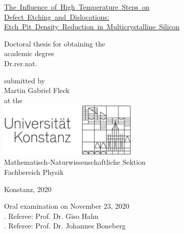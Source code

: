\documentclass[titlepage,a4paper]{article}
\newcommand{\tinyspace}{\nobreak\hspace{.16667em}}
\begin{document}
\thispagestyle{empty}
\begin{center}
  \begin{sffamily}
    \begin{bfseries}
      \begin{LARGE}
	\vspace*{8mm}
	\mbox{\ul{The Influence of High Temperature Steps on}}\\%
	\mbox{\ul{Defect Etching and Dislocations:}}\\%
	\mbox{\ul{Etch Pit Density Reduction in Multicrystalline Silicon}}\\%
	\vspace{15mm}
      \end{LARGE}
      \begin{Large}
	\Large
	Doctoral thesis for obtaining the\\[0.6\baselineskip]
	academic degree\\[0.6\baselineskip]
	Dr.{\tinyspace}rer.{\tinyspace}nat.\\
      \end{Large}
    \end{bfseries}
    \begin{mdseries}
      \begin{large}
	\vspace{15mm}
	submitted by \\[0.6\baselineskip]
	Martin Gabriel Fleck\\
	\vspace{15mm}
	at the\\[\baselineskip]
	{\includegraphics[width=0.5\textwidth]{UniKonstanz_Logo_Optimum_SW}}\\
	\vspace{24mm}
	Mathematisch-Naturwissenschaftliche Sektion\\[0.6\baselineskip]
	Fachbereich Physik\\
      \end{large}
    \end{mdseries}
  \end{sffamily}

\end{center}

{
  \large\mdseries\sffamily
  \vspace{27mm}
  \noindent
  Konstanz, 2020
}

\newpage
{
  \thispagestyle{empty}
  \large\mdseries\sffamily
  \null %
  \vspace{0.8\textheight}
  {
    \noindent
    Oral examination on November 23, 2020 \\

    . Referee: Prof. Dr. Giso Hahn \\

    . Referee: Prof. Dr. Johannes Boneberg
  }
}
\end{document}
